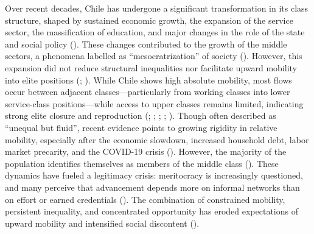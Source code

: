 \documentclass[
  13pt,
]{article}
\begin{document}
Over recent decades, Chile has undergone a significant transformation in
its class structure, shaped by sustained economic growth, the expansion
of the service sector, the massification of education, and major changes
in the role of the state and social policy
(). These
changes contributed to the growth of the middle sectors, a phenomena
labelled as ``mesocratrization'' of society
().
However, this expansion did not reduce structural inequalities nor
facilitate upward mobility into elite positions
(;
). While Chile shows high absolute mobility, most flows occur
between adjacent classes---particularly from working classes into lower
service-class positions---while access to upper classes remains limited,
indicating strong elite closure and reproduction
(;
;
; ;
). Though often
described as ``unequal but fluid'', recent evidence points to growing
rigidity in relative mobility, especially after the economic slowdown,
increased household debt, labor market precarity, and the COVID-19
crisis ().
However, the majority of the population identifies themselves as members
of the middle class (). These dynamics have fueled a legitimacy crisis: meritocracy is
increasingly questioned, and many perceive that advancement depends more
on informal networks than on effort or earned credentials
(). The
combination of constrained mobility, persistent inequality, and
concentrated opportunity has eroded expectations of upward mobility and
intensified social discontent ().
\end{document}
